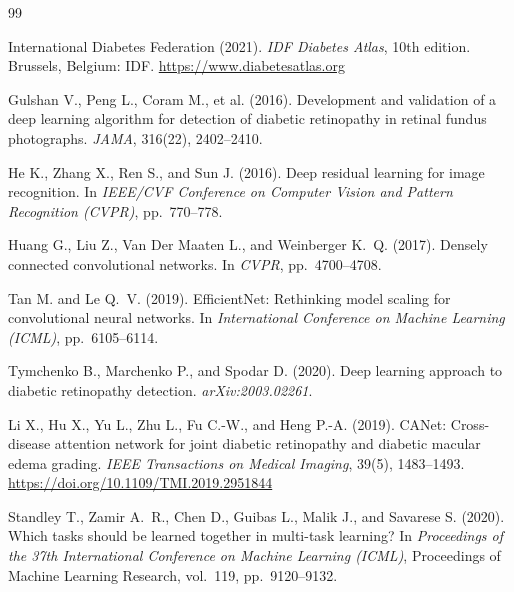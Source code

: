 \documentclass[12pt,a4paper]{article}
\begin{document}
\newpage

\begin{thebibliography}{99}

International Diabetes Federation (2021).
\emph{IDF Diabetes Atlas}, 10th edition.
Brussels, Belgium: IDF.
\url{https://www.diabetesatlas.org}

Gulshan V., Peng L., Coram M., et al. (2016).
Development and validation of a deep learning algorithm for detection of diabetic retinopathy in retinal fundus photographs.
\emph{JAMA}, 316(22), 2402--2410.

He K., Zhang X., Ren S., and Sun J. (2016).
Deep residual learning for image recognition.
In \emph{IEEE/CVF Conference on Computer Vision and Pattern Recognition (CVPR)}, pp.\ 770--778.

Huang G., Liu Z., Van Der Maaten L., and Weinberger K.\ Q. (2017).
Densely connected convolutional networks.
In \emph{CVPR}, pp.\ 4700--4708.

Tan M. and Le Q.\ V. (2019).
EfficientNet: Rethinking model scaling for convolutional neural networks.
In \emph{International Conference on Machine Learning (ICML)}, pp.\ 6105--6114.

Tymchenko B., Marchenko P., and Spodar D. (2020).
Deep learning approach to diabetic retinopathy detection.
\emph{arXiv:2003.02261}.

Li X., Hu X., Yu L., Zhu L., Fu C.-W., and Heng P.-A. (2019).
CANet: Cross-disease attention network for joint diabetic retinopathy and diabetic macular edema grading.
\emph{IEEE Transactions on Medical Imaging}, 39(5), 1483--1493.
\url{https://doi.org/10.1109/TMI.2019.2951844}

Standley T., Zamir A.\ R., Chen D., Guibas L., Malik J., and Savarese S. (2020).
Which tasks should be learned together in multi-task learning?
In \emph{Proceedings of the 37th International Conference on Machine Learning (ICML)},
Proceedings of Machine Learning Research, vol.\ 119, pp.\ 9120--9132.


\end{thebibliography}
\end{document}
